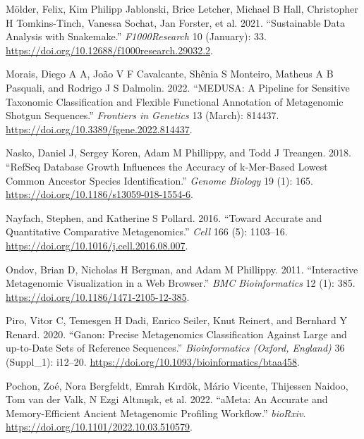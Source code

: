 \documentclass[
]{article}
\newlength{\cslhangindent}
\newlength{\cslentryspacingunit} %
\newenvironment{CSLReferences}[2] %
 {%
  \setlength{\parindent}{0pt}
  \ifodd #1
  \let\oldpar\par
  \def\par{\hangindent=\cslhangindent\oldpar}
  \fi
  \setlength{\parskip}{#2\cslentryspacingunit}
 }%
 {}
\begin{document}
\begin{CSLReferences}{1}{0}
\leavevmode{}%
Mölder, Felix, Kim Philipp Jablonski, Brice Letcher, Michael B Hall,
Christopher H Tomkins-Tinch, Vanessa Sochat, Jan Forster, et al. 2021.
{``Sustainable Data Analysis with Snakemake.''} \emph{F1000Research} 10
(January): 33. \url{https://doi.org/10.12688/f1000research.29032.2}.

\leavevmode{}%
Morais, Diego A A, João V F Cavalcante, Shênia S Monteiro, Matheus A B
Pasquali, and Rodrigo J S Dalmolin. 2022. {``{MEDUSA}: A Pipeline for
Sensitive Taxonomic Classification and Flexible Functional Annotation of
Metagenomic Shotgun Sequences.''} \emph{Frontiers in Genetics} 13
(March): 814437. \url{https://doi.org/10.3389/fgene.2022.814437}.

\leavevmode{}%
Nasko, Daniel J, Sergey Koren, Adam M Phillippy, and Todd J Treangen.
2018. {``{RefSeq} Database Growth Influences the Accuracy of k-Mer-Based
Lowest Common Ancestor Species Identification.''} \emph{Genome Biology}
19 (1): 165. \url{https://doi.org/10.1186/s13059-018-1554-6}.

\leavevmode{}%
Nayfach, Stephen, and Katherine S Pollard. 2016. {``Toward Accurate and
Quantitative Comparative Metagenomics.''} \emph{Cell} 166 (5): 1103--16.
\url{https://doi.org/10.1016/j.cell.2016.08.007}.

\leavevmode{}%
Ondov, Brian D, Nicholas H Bergman, and Adam M Phillippy. 2011.
{``Interactive Metagenomic Visualization in a Web Browser.''} \emph{BMC
Bioinformatics} 12 (1): 385.
\url{https://doi.org/10.1186/1471-2105-12-385}.

\leavevmode{}%
Piro, Vitor C, Temesgen H Dadi, Enrico Seiler, Knut Reinert, and
Bernhard Y Renard. 2020. {``Ganon: Precise Metagenomics Classification
Against Large and up-to-Date Sets of Reference Sequences.''}
\emph{Bioinformatics (Oxford, England)} 36 (Suppl\_1): i12--20.
\url{https://doi.org/10.1093/bioinformatics/btaa458}.

\leavevmode{}%
Pochon, Zoé, Nora Bergfeldt, Emrah Kırdök, Mário Vicente, Thijessen
Naidoo, Tom van der Valk, N Ezgi Altınışık, et al. 2022. {``{aMeta}: An
Accurate and Memory-Efficient Ancient Metagenomic Profiling Workflow.''}
\emph{bioRxiv}. \url{https://doi.org/10.1101/2022.10.03.510579}.


\end{CSLReferences}
\end{document}
